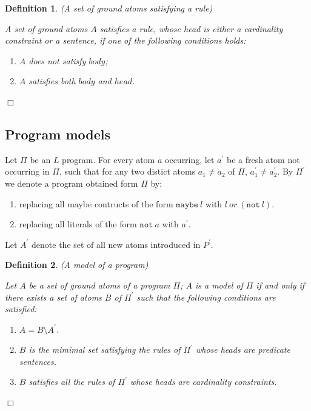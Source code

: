 \documentclass[a4paper,10pt]{article}
\newtheorem{definition}{Definition}
\begin{document}
\begin{definition}(A set of ground atoms satisfying a rule)\\
\rm{
A set of ground atoms $A$ satisfies a rule, whose head is either a cardinality constraint or a sentence, if one of the following conditions holds:
\begin{enumerate}
\item $A$ does not satisfy $body$;
\item $A$ satisfies both $body$ and $head$.
\end{enumerate}
}
\hfill $\Box$
\end{definition}




\subsection{Program models}

Let $\Pi$ be an $L$ program.
For every atom $a$ occurring, let $a^\prime$ be a fresh atom not occurring in $\Pi$, such that for any two distict atoms $a_1 \not= a_2$ of $\Pi$, $a^\prime_1 \not= a^\prime_2$.
By $\Pi^\prime$ we denote a program obtained form $\Pi$ by:

\begin{enumerate}
\item replacing all maybe contructs of the form $\texttt{maybe}~l$ with $l~or~(\texttt{not}~l)$.
\item replacing all literals of the form $\texttt{not}~a$ with $a^\prime$. 
\end{enumerate}

\noindent
Let $A^\prime$ denote the set of all new atoms introduced in $P^\prime$.


\begin{definition}(A model of a program)\\
\rm{
Let $A$ be a set of ground atoms of a program $\Pi$; $A$ is a model of $\Pi$ if and only if 
there exists a set of atoms $B$ of $\Pi^\prime$ such that  the following conditions are satisfied:
\begin{enumerate}
\item $A = B \setminus A^\prime$.
\item $B$ is the mimimal set satisfying the rules of $\Pi^\prime$ whose heads are predicate sentences.
\item $B$ satisfies all the rules of $\Pi^\prime$ whose heads are cardinality constraints.
\end{enumerate}
}
\hfill$\Box$
\end{definition}
\end{document}
